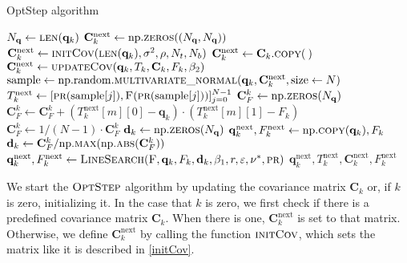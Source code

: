 \begin{algorithm}[H]%
\caption{\label{OptStep}OptStep algorithm}
\begin{algorithmic}[1]
\State $N_\mathbf{q}\gets\Call{len}{\mathbf{q}_k}$
\State $\mathbf{C}^\mathrm{next}_k \gets \mathrm{np.}\Call{zeros}{(N_\mathbf{q}, N_\mathbf{q})}$
\State $\mathbf{C}^\mathrm{next}_k \gets \Call{initCov}{\protect\Call{len}{\mathbf{q}_k}, \sigma^2, \rho, N_t, N_b}$
\Else
\State $\mathbf{C}^\mathrm{next}_k \gets \mathbf{C}_k.\Call{copy}{\:}$
\EndIf
\Else
\State $\mathbf{C}^\mathrm{next}_k \gets \Call{updateCov}{\mathbf{q}_k, T_k, \mathbf{C}_k, F_k ,\beta_2}$
\EndIf
\State $\mathrm{sample} \gets \mathrm{np.random.}\Call{multivariate\_normal}{\mathbf{q}_k, \mathbf{C}^\mathrm{next}_k, \mathrm{size} \gets N}$
\State \label{OptStepFOMCall1}$T^\mathrm{next}_k\gets[\Call{pr}{\mathrm{sample}[j]},\Call{F}{\protect\Call{pr}{\mathrm{sample}[j]}}]_{j=0}^{N-1}$
\State $\mathbf{C}^k_F \gets \mathrm{np.}\Call{zeros}{N_\mathbf{q}}$
\State $\mathbf{C}^k_F \gets \mathbf{C}^k_F+(T^\mathrm{next}_k[m][0]-\mathbf{q}_k)\cdot(T^\mathrm{next}_k[m][1]-F_k)$
\EndFor
\State $\mathbf{C}^k_F \gets 1/(N-1)\cdot\mathbf{C}^k_F$
\State $\mathbf{d}_k \gets \mathrm{np.}\Call{zeros}{N_\mathbf{q}}$
\State $\mathbf{q}^\mathrm{next}_{k}, F^\mathrm{next}_k \gets \mathrm{np.}\Call{copy}{\mathbf{q}_k},F_k$
\State $\mathbf{d}_k \gets \mathbf{C}^k_F/\mathrm{np.}\Call{max}{\mathrm{np.}\protect\Call{abs}{\mathbf{C}^k_F}}$
\State \label{OptStepFOMCall2}$\mathbf{q}^\mathrm{next}_{k}, F^\mathrm{next}_k \gets \Call{LineSearch}{\textproc{F},\mathbf{q}_k,F_k,\mathbf{d}_k,\beta_1,r,\varepsilon,\nu^*,\textproc{pr}}$
\EndIf
\State \Return $\mathbf{q}^\mathrm{next}_k,T^\mathrm{next}_k,\mathbf{C}^\mathrm{next}_k,F^\mathrm{next}_k$
\EndFunction
\end{algorithmic}
\end{algorithm}

We start the $\textproc{OptStep}$ algorithm by updating the covariance matrix $\mathbf{C}_k$ or, if $k$ is zero, initializing it. In the case that $k$ is zero, we first check if there is a predefined covariance matrix $\mathbf{C}_k$. When there is one, $\mathbf{C}^\mathrm{next}_k$ is set to that matrix. Otherwise, we define $\mathbf{C}^\mathrm{next}_k$ by calling the function $\textproc{initCov}$, which sets the matrix like it is described in \eqref{initCov}.

